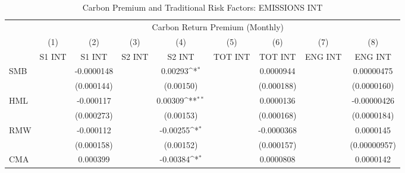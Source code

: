 \begin{table}[htbp]\centering
\def\sym#1{\ifmmode^{#1}\else\(^{#1}\)\fi}
\caption{Carbon Premium and Traditional Risk Factors: EMISSIONS INT}
\begin{tabular}{l*{8}{c}}
\hline\hline
                    &\multicolumn{8}{c}{Carbon Return Premium (Monthly)}                                                                                                                            \\\cmidrule(lr){2-9}
                    &\multicolumn{1}{c}{(1)}&\multicolumn{1}{c}{(2)}&\multicolumn{1}{c}{(3)}&\multicolumn{1}{c}{(4)}&\multicolumn{1}{c}{(5)}&\multicolumn{1}{c}{(6)}&\multicolumn{1}{c}{(7)}&\multicolumn{1}{c}{(8)}\\
                    &\multicolumn{1}{c}{S1 INT}&\multicolumn{1}{c}{S1 INT}&\multicolumn{1}{c}{S2 INT}&\multicolumn{1}{c}{S2 INT}&\multicolumn{1}{c}{TOT INT}&\multicolumn{1}{c}{TOT INT}&\multicolumn{1}{c}{ENG INT}&\multicolumn{1}{c}{ENG INT}\\
\hline
SMB                 &                     &  -0.0000148         &                     &     0.00293\sym{*}  &                     &   0.0000944         &                     &  0.00000475         \\
                    &                     &  (0.000144)         &                     &   (0.00150)         &                     &  (0.000188)         &                     & (0.0000160)         \\
HML                 &                     &   -0.000117         &                     &     0.00309\sym{**} &                     &   0.0000136         &                     & -0.00000426         \\
                    &                     &  (0.000273)         &                     &   (0.00153)         &                     &  (0.000168)         &                     & (0.0000184)         \\
RMW                 &                     &   -0.000112         &                     &    -0.00255\sym{*}  &                     &  -0.0000368         &                     &   0.0000145         \\
                    &                     &  (0.000158)         &                     &   (0.00152)         &                     &  (0.000157)         &                     &(0.00000957)         \\
CMA                 &                     &    0.000399         &                     &    -0.00384\sym{*}  &                     &   0.0000808         &                     &   0.0000142         \\

\end{tabular}
\end{table}
